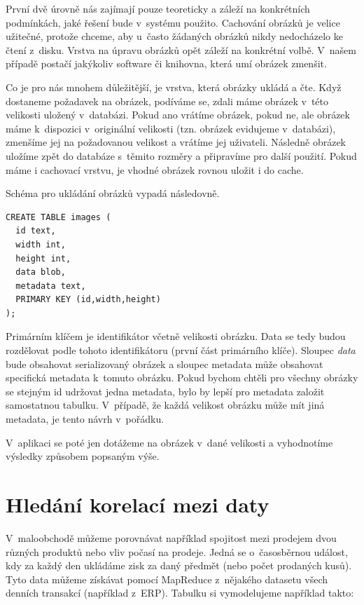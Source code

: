 První dvě úrovně nás zajímají pouze teoreticky a záleží na konkrétních podmínkách, jaké řešení bude v~systému použito. Cachování obrázků je velice užitečné, protože chceme, aby u~často žádaných obrázků nikdy nedocházelo ke čtení z~disku. Vrstva na úpravu obrázků opět záleží na konkrétní volbě. V~našem případě postačí jakýkoliv software či knihovna, která umí obrázek zmenšit. 

Co je pro nás mnohem důležitější, je vrstva, která obrázky ukládá a čte. Když dostaneme požadavek na obrázek, podíváme se, zdali máme obrázek v~této velikosti uložený v~databázi. Pokud ano vrátíme obrázek, pokud ne, ale obrázek máme k~dispozici v~originální velikosti (tzn. obrázek evidujeme v~databázi), zmenšíme jej na požadovanou velikost a vrátíme jej uživateli. Následně obrázek uložíme zpět do databáze s~těmito rozměry a připravíme pro další použití. Pokud máme i cachovací vrstvu, je vhodné obrázek rovnou uložit i do cache. 

Schéma pro ukládání obrázků vypadá následovně. 

\begin{lstlisting}[caption={Tabulka pro ukládání obrázků v~různých velikostech},label=img1]
CREATE TABLE images ( 
  id text,
  width int,
  height int,
  data blob,
  metadata text, 
  PRIMARY KEY (id,width,height) 
);
\end{lstlisting}

Primárním klíčem je identifikátor včetně velikosti obrázku. Data se tedy budou rozdělovat podle tohoto identifikátoru (první část primárního klíče). Sloupec \emph{data} bude obsahovat serializovaný obrázek a sloupec metadata může obsahovat specifická metadata k~tomuto obrázku. Pokud bychom chtěli pro všechny obrázky se stejným id udržovat jedna metadata, bylo by lepší pro metadata založit samostatnou tabulku. V~případě, že každá velikost obrázku může mít jiná metadata, je tento návrh v~pořádku. 

V~aplikaci se poté jen dotážeme na obrázek v~dané velikosti a vyhodnotíme výsledky způsobem popsaným výše. 

\section{Hledání korelací mezi daty}
V~maloobchodě můžeme porovnávat například spojitost mezi prodejem dvou různých produktů nebo vliv počasí na prodeje. Jedná se o~časosběrnou událost, kdy za každý den ukládáme zisk za daný předmět (nebo počet prodaných kusů). Tyto data můžeme získávat pomocí MapReduce z~nějakého datasetu všech denních transakcí (například z~ERP). Tabulku si vymodelujeme například takto: 


